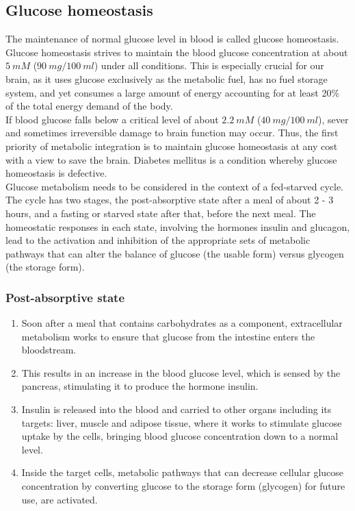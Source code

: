 \documentclass[11pt]{article}
\begin{document}
\subsection{Glucose homeostasis}
\label{sec:orgea71fdb}
The maintenance of normal glucose level in blood is called glucose homeostasis. Glucose homeostasis strives to maintain the blood glucose concentration at about \(\qty{5}{\unit{mM}}\) (\(\qty{90}{\unit{mg}} / \qty{100}{\unit{ml}}\)) under all conditions. This is especially crucial for our brain, as it uses glucose exclusively as the metabolic fuel, has no fuel storage system, and yet consumes a large amount of energy accounting for at least 20\% of the total energy demand of the body.
\\[0pt]

If blood glucose falls below a critical level of about \(\qty{2.2}{\unit{mM}}\) (\(\qty{40}{\unit{mg}} / \qty{100}{\unit{ml}}\)), sever and sometimes irreversible damage to brain function may occur. Thus, the first priority of metabolic integration is to maintain glucose homeostasis at any cost with a view to save the brain. Diabetes mellitus is a condition whereby glucose homeostasis is defective.
\\[0pt]

Glucose metabolism needs to be considered in the context of a fed-starved cycle. The cycle has two stages, the post-absorptive state after a meal of about 2 - 3 hours, and a fasting or starved state after that, before the next meal. The homeostatic responses in each state, involving the hormones insulin and glucagon, lead to the activation and inhibition of the appropriate sets of metabolic pathways that can alter the balance of glucose (the usable form) versus glycogen (the storage form).

\newpage

\subsubsection{Post-absorptive state}
\label{sec:org98f0096}
\begin{enumerate}
\item Soon after a meal that contains carbohydrates as a component, extracellular metabolism works to ensure that glucose from the intestine enters the bloodstream.
\item This results in an increase in the blood glucose level, which is sensed by the pancreas, stimulating it to produce the hormone insulin.
\item Insulin is released into the blood and carried to other organs including its targets: liver, muscle and adipose tissue, where it works to stimulate glucose uptake by the cells, bringing blood glucose concentration down to a normal level.
\item Inside the target cells, metabolic pathways that can decrease cellular glucose concentration by converting glucose to the storage form (glycogen) for future use, are activated.
\end{enumerate}
\end{document}
